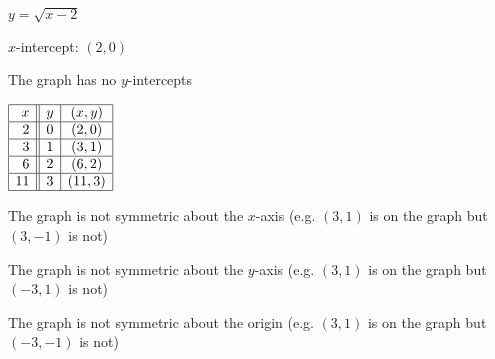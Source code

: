 {$y = \sqrt{x - 2}$}
{
$x$-intercept: $(2, 0)$  \smallskip

The graph has no $y$-intercepts \smallskip

$\begin{array}{|r||c|c|}  

\hline
 x & y & (x,y) \\ \hline
 2 & 0 & (2, 0) \\  \hline
 3 & 1 & (3, 1) \\ \hline
 6 & 2 & (6, 2) \\ \hline
11 & 3 & (11, 3) \\ \hline
 
\end{array} $ \smallskip


\smallskip

The graph is not symmetric about the $x$-axis (e.g. $(3, 1)$ is on the graph but $(3, -1)$ is not) \smallskip

The graph is not symmetric about the $y$-axis (e.g. $(3, 1)$ is on the graph but $(-3, 1)$ is not) \smallskip

The graph is not symmetric about the origin (e.g. $(3, 1)$ is on the graph but $(-3, -1)$ is not)
}